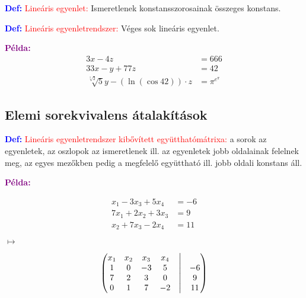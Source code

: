 \documentclass[../szamtud.tex]{subfiles}
\begin{document}
    \textcolor{blue}{\textbf{Def:}} \textcolor{red}{Lineáris egyenlet: } Ismeretlenek konstansszorosainak összeges konstans. 
    
    \textcolor{blue}{\textbf{Def:}} \textcolor{red}{Lineáris egyenletrendszer:} Véges sok lineáris egyenlet. 

    \textcolor{purple}{\textbf{Példa:}} 
    \begin{align*} 
        3x-4z &= 666 \\ 
        33x-y+77z &= 42 \\
        \sqrt[{\sqrt[3]{2}}]{5}y-(\ln(\cos42))\cdot z &= \pi^{e^\pi} 
    \end{align*}

    \subsection{Elemi sorekvivalens átalakítások}

        \textcolor{blue}{\textbf{Def:}} \textcolor{red}{Lineáris egyenletrendszer kibővített együtthatómátrixa:} a sorok az egyenletek, az oszlopok az ismeretlenek ill. az egyenletek jobb oldalainak felelnek meg, az egyes mezőkben pedig a megfelelő együttható ill. jobb oldali konstans áll.

        \textcolor{purple}{\textbf{Példa:}}

        \begin{minipage}{.4\linewidth}
            \begin{align*}
                x_1-3x_3+5x_4 &= -6 \\
                7x_1+2x_2+3x_3 &= 9 \\
                x_2+7x_3-2x_4 &= 11
            \end{align*}
        \end{minipage}%
        \begin{minipage}{.1\linewidth}
            $\longmapsto$
        \end{minipage}%
        \begin{minipage}{.0\linewidth}
            \begin{align*}
                \begin{pmatrix}
                    x_1 & x_2 & x_3 & x_4 & \bigm| &  \\
                    1 & 0 & -3 & 5 & \bigm| & -6 \\
                    7 & 2 & 3 & 0 & \bigm| & 9 \\
                    0 & 1 & 7 & -2 & \bigm| & 11 
                \end{pmatrix}
            \end{align*}
        \end{minipage}%
    
\end{document}
